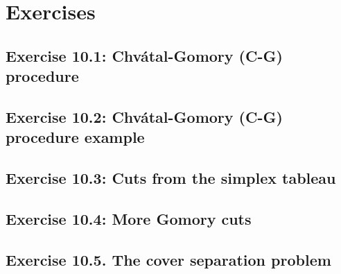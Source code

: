 \section{Exercises}

\subsection*{Exercise 10.1: Chv\'atal-Gomory (C-G) procedure}


\subsection*{Exercise 10.2: Chv\'atal-Gomory (C-G) procedure example}


\subsection*{Exercise 10.3: Cuts from the simplex tableau}


\subsection*{Exercise 10.4: More Gomory cuts}


\subsection*{Exercise 10.5. The cover separation problem}




